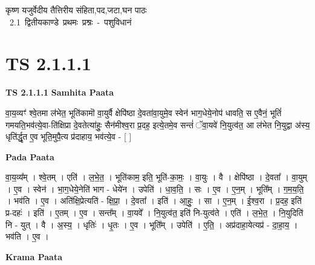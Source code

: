 \documentclass[17pt]{extarticle}
\begin{document}
\begin{titlepage}
    \begin{center}
 
\begin{sanskrit}
    { \Large
    कृष्ण यजुर्वेदीय तैत्तिरीय संहिता,पद,जटा,घन पाठः 
    }
    \\
    \vspace{2.5cm}
    \mbox{ \Large
    2.1      द्वितीयकाण्डे  प्रथमः प्रश्नः - पशुविधानं   }
\end{sanskrit}
\end{center}

\end{titlepage}
\tableofcontents
{}
\pagebreak


\section{ TS 2.1.1.1 }

\textbf{TS 2.1.1.1 } \newline
\textbf{Samhita Paata} \newline

वा॒य॒व्यꣳ॑ श्वे॒तमा ल॑भेत॒ भूति॑कामॊ  वा॒युर्वै क्षेपि॑ष्ठा दे॒वता॑वा॒युमे॒व स्वेन॑ भाग॒धेये॒नोप॑ धावति॒ स ए॒वैनं॒ भूतिं॑ गमयति॒भव॑त्ये॒वा-ति॑क्षिप्रा दे॒वतेत्या॑हुः॒ सैन॑मीश्व॒रा प्र॒दह॒ इत्ये॒तमे॒व सन्तं॑ ॅवा॒यवे॑ नि॒युत्व॑त॒ आ ल॑भेत नि॒युद्वा अ॑स्य॒ धृति॑र्द्धृ॒त ए॒व भूति॒मुपै॒त्य प्र॑दाहाय॒ भव॑त्ये॒व - [  ] \newline

\textbf{Pada Paata} \newline

वा॒य॒व्य᳚म् । श्वे॒तम् । एति॑ । ल॒भे॒त॒ । भूति॑काम॒ इति॒ भूति॑-का॒मः॒ । वा॒युः । वै । क्षेपि॑ष्ठा । दे॒वता᳚ । वा॒युम् । ए॒व । स्वेन॑ । भा॒ग॒धेये॒नेति॑ भाग - धेये॑न । उपेति॑ । धा॒व॒ति॒ । सः । ए॒व । ए॒न॒म् । भूति᳚म् । ग॒म॒य॒ति॒ । भव॑ति । ए॒व । अति॑क्षि॒प्रेत्यति॑ - क्षि॒प्रा॒ । दे॒वता᳚ । इति॑ । आ॒हुः॒ । सा । ए॒न॒म् । ई॒श्व॒रा । प्र॒दह॒ इति॑ प्र-दहः॑ । इति॑ । ए॒तम् । ए॒व । सन्त᳚म् । वा॒यवे᳚ । नि॒युत्व॑त॒ इति॑ नि-युत्व॑ते । एति॑ । ल॒भे॒त॒ । नि॒युदिति॑ नि - युत् । वै । अ॒स्य॒ । धृतिः॑ । धृ॒तः । ए॒व । भूति᳚म् । उपेति॑ । ए॒ति॒ । अप्र॑दाहा॒येत्यप्र॑ - दा॒हा॒य॒ । भव॑ति । ए॒व ।  \newline


\textbf{Krama Paata} \newline
\end{document}
